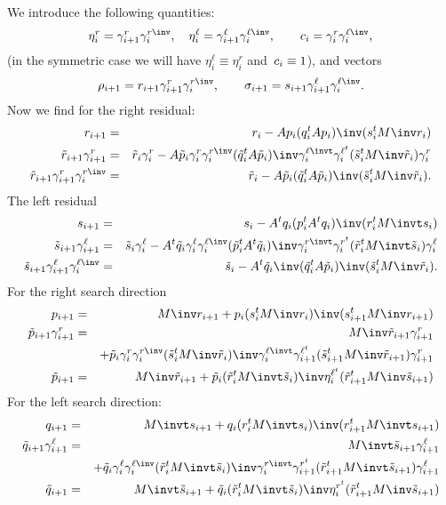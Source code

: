 \documentclass[11pt]{artikel3}
\begin{document}
\begin{Outline}
We introduce the following quantities:
\[ \eta^r_i=\gr_{i+1}\grinv_i, \quad \eta^\ell_i=\gl_{i+1}\glinv_i,
    \qquad c_i=\gr_i\glinv_i, \]
(in the symmetric case we will have $\eta^\ell_i\equiv\eta^r_i$
and~$c_i\equiv\nobreak1$),
and vectors
\[ \rho_{i+1}=r_{i+1}\gr_{i+1}\grinv_i, \qquad
    \sigma_{i+1}=s_{i+1}\gl_{i+1}\glinv_i. \]
Now we find 
for the right residual:
\begin{eqnarray*}
    r_{i+1}&=&r_i-Ap_i(q_i^tAp_i)\inv(s_i^tM\inv r_i)\\
    \tilde r_{i+1}\gr_{i+1}&=&\tilde r_i\gr_i-
        A\tilde p_i\gr_i\grinv_i(\tilde q_i^tA\tilde p_i)\inv\glinvt_i
                \glt_i(\tilde s_i^tM\inv \tilde r_i)\gr_i\\
    \tilde r_{i+1}\gr_{i+1}\grinv_i&=&
        \tilde r_i-A\tilde p_i(\tilde q_i^tA\tilde p_i)\inv
                (\tilde s_i^tM\inv \tilde r_i).
    \end{eqnarray*}
The left residual
\begin{eqnarray*}
    s_{i+1}&=&s_i-A^tq_i(p_i^tA^tq_i)\inv(r_i^tM\invt s_i)\\
    \tilde s_{i+1}\gl_{i+1}&=&\tilde s_i\gl_i-
        A^t\tilde q_i\gl_i\glinv_i(\tilde p_i^tA^t\tilde q_i)\inv\grinvt_i
                \grt_i(\tilde r_i^tM\invt \tilde s_i)\gl_i\\
    \tilde s_{i+1}\gl_{i+1}\glinv_i&=&
        \tilde s_i-A^t\tilde q_i\inv
                (\tilde q_i^tA\tilde p_i)\inv(\tilde s_i^tM\inv \tilde r_i).
    \end{eqnarray*}
For the right search direction
\begin{eqnarray*}
    p_{i+1}&=&M\inv r_{i+1}+p_i(s_i^tM\inv r_i)\inv(s_{i+1}^tM\inv r_{i+1})\\
    \tilde p_{i+1}\gr_{i+1}&=&M\inv \tilde r_{i+1}\gr_{i+1}\\
        &&+\tilde p_i\gr_i\grinv_i (\tilde s_i^tM\inv \tilde r_i)\inv
                \glinvt_i\glt_{i+1}
        (\tilde s_{i+1}^tM\inv \tilde r_{i+1})\gr_{i+1}\\
    \tilde p_{i+1}&=&M\inv \tilde r_{i+1}
        +\tilde p_i (\tilde r_i^tM\invt \tilde s_i)\inv \eta^{\ell^t}_i
        (\tilde r_{i+1}^tM\inv \tilde s_{i+1})
\end{eqnarray*}
For the left search direction:
\begin{eqnarray*}
    q_{i+1}&=&M\invt s_{i+1}
        +q_i(r_i^tM\invt s_i)\inv(r_{i+1}^tM\invt s_{i+1})\\
    \tilde q_{i+1}\gl_{i+1}&=&M\invt \tilde s_{i+1}\gl_{i+1}\\
        &&+\tilde q_i\gl_i\glinv_i (\tilde r_i^tM\invt \tilde s_i)\inv
                \grinvt_i\grt_{i+1}
        (\tilde r_{i+1}^tM\invt \tilde s_{i+1})\gl_{i+1}\\
    \tilde q_{i+1}&=&M\invt \tilde s_{i+1}
        +\tilde q_i (\tilde r_i^tM\invt \tilde s_i)\inv \eta^{r^t}_i
        (\tilde r_{i+1}^tM\inv \tilde s_{i+1})
\end{eqnarray*}


\end{Outline}
\end{document}

